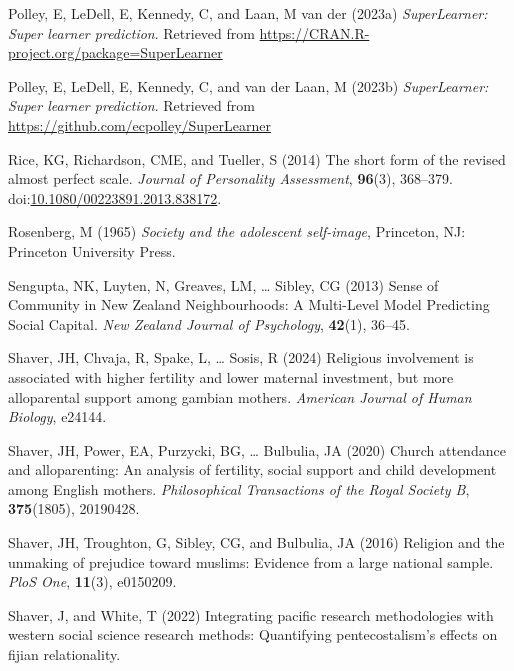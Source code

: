 \documentclass[
  single column]{article}
\newlength{\cslhangindent}
\newenvironment{CSLReferences}[2] %
 {\begin{list}{}{%
  \setlength{\itemindent}{0pt}
  \setlength{\leftmargin}{0pt}
  \setlength{\parsep}{0pt}
  \ifodd #1
   \setlength{\leftmargin}{\cslhangindent}
   \setlength{\itemindent}{-1\cslhangindent}
  \fi
  \setlength{\itemsep}{#2\baselineskip}}}
 {\end{list}}
\begin{document}
\begin{CSLReferences}{1}{0}
Polley, E, LeDell, E, Kennedy, C, and Laan, M van der (2023a)
\emph{SuperLearner: Super learner prediction}. Retrieved from
\url{https://CRAN.R-project.org/package=SuperLearner}

Polley, E, LeDell, E, Kennedy, C, and van der Laan, M (2023b)
\emph{SuperLearner: Super learner prediction}. Retrieved from
\url{https://github.com/ecpolley/SuperLearner}

Rice, KG, Richardson, CME, and Tueller, S (2014) The short form of the
revised almost perfect scale. \emph{Journal of Personality Assessment},
\textbf{96}(3), 368--379.
doi:\href{https://doi.org/10.1080/00223891.2013.838172}{10.1080/00223891.2013.838172}.

Rosenberg, M (1965) \emph{Society and the adolescent self-image},
Princeton, NJ: Princeton University Press.

Sengupta, NK, Luyten, N, Greaves, LM, \ldots{} Sibley, CG (2013) Sense
of Community in {N}ew {Z}ealand Neighbourhoods: A Multi-Level Model
Predicting Social Capital. \emph{New Zealand Journal of Psychology},
\textbf{42}(1), 36--45.

Shaver, JH, Chvaja, R, Spake, L, \ldots{} Sosis, R (2024) Religious
involvement is associated with higher fertility and lower maternal
investment, but more alloparental support among gambian mothers.
\emph{American Journal of Human Biology}, e24144.

Shaver, JH, Power, EA, Purzycki, BG, \ldots{} Bulbulia, JA (2020) Church
attendance and alloparenting: An analysis of fertility, social support
and child development among {E}nglish mothers. \emph{Philosophical
Transactions of the Royal Society B}, \textbf{375}(1805), 20190428.

Shaver, JH, Troughton, G, Sibley, CG, and Bulbulia, JA (2016) Religion
and the unmaking of prejudice toward muslims: Evidence from a large
national sample. \emph{PloS One}, \textbf{11}(3), e0150209.

Shaver, J, and White, T (2022) Integrating pacific research
methodologies with western social science research methods: Quantifying
pentecostalism's effects on fijian relationality.


\end{CSLReferences}
\end{document}
